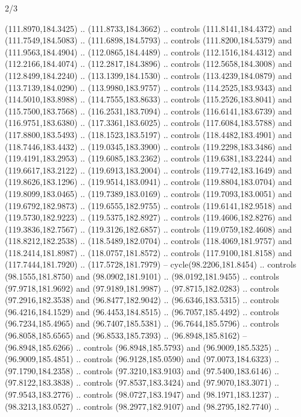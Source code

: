 \begin{flagdescription}{2/3}
\begin{scope}[shift={(0.5\flaglength,0.5)},scale=\flagwidth/320]
\begin{scope}[y=0.8pt, x=0.8pt, yscale=-1,shift={(-118.3,-146)}]
  (111.8970,184.3425) .. (111.8733,184.3662) .. controls (111.8141,184.4372) and
  (111.7549,184.5083) .. (111.6898,184.5793) .. controls (111.8200,184.5379) and
  (111.9563,184.4904) .. (112.0865,184.4489) .. controls (112.1516,184.4312) and
  (112.2166,184.4074) .. (112.2817,184.3896) .. controls (112.5658,184.3008) and
  (112.8499,184.2240) .. (113.1399,184.1530) .. controls (113.4239,184.0879) and
  (113.7139,184.0290) .. (113.9980,183.9757) .. controls (114.2525,183.9343) and
  (114.5010,183.8988) .. (114.7555,183.8633) .. controls (115.2526,183.8041) and
  (115.7500,183.7568) .. (116.2531,183.7094) .. controls (116.6141,183.6739) and
  (116.9751,183.6380) .. (117.3361,183.6025) .. controls (117.6084,183.5788) and
  (117.8800,183.5493) .. (118.1523,183.5197) .. controls (118.4482,183.4901) and
  (118.7446,183.4432) .. (119.0345,183.3900) .. controls (119.2298,183.3486) and
  (119.4191,183.2953) .. (119.6085,183.2362) .. controls (119.6381,183.2244) and
  (119.6617,183.2122) .. (119.6913,183.2004) .. controls (119.7742,183.1649) and
  (119.8626,183.1296) .. (119.9514,183.0941) .. controls (119.8804,183.0704) and
  (119.8099,183.0465) .. (119.7389,183.0169) .. controls (119.7093,183.0051) and
  (119.6792,182.9873) .. (119.6555,182.9755) .. controls (119.6141,182.9518) and
  (119.5730,182.9223) .. (119.5375,182.8927) .. controls (119.4606,182.8276) and
  (119.3836,182.7567) .. (119.3126,182.6857) .. controls (119.0759,182.4608) and
  (118.8212,182.2538) .. (118.5489,182.0704) .. controls (118.4069,181.9757) and
  (118.2414,181.8987) .. (118.0757,181.8572) .. controls (117.9100,181.8158) and
  (117.7444,181.7920) .. (117.5728,181.7979) -- cycle(98.2206,181.8454) ..
  controls (98.1555,181.8750) and (98.0902,181.9101) .. (98.0192,181.9455) ..
  controls (97.9718,181.9692) and (97.9189,181.9987) .. (97.8715,182.0283) ..
  controls (97.2916,182.3538) and (96.8477,182.9042) .. (96.6346,183.5315) ..
  controls (96.4216,184.1529) and (96.4453,184.8515) .. (96.7057,185.4492) ..
  controls (96.7234,185.4965) and (96.7407,185.5381) .. (96.7644,185.5796) ..
  controls (96.8058,185.6565) and (96.8533,185.7393) .. (96.8948,185.8162) --
  (96.8948,185.6266) .. controls (96.8948,185.5793) and (96.9009,185.5325) ..
  (96.9009,185.4851) .. controls (96.9128,185.0590) and (97.0073,184.6323) ..
  (97.1790,184.2358) .. controls (97.3210,183.9103) and (97.5400,183.6146) ..
  (97.8122,183.3838) .. controls (97.8537,183.3424) and (97.9070,183.3071) ..
  (97.9543,183.2776) .. controls (98.0727,183.1947) and (98.1971,183.1237) ..
  (98.3213,183.0527) .. controls (98.2977,182.9107) and (98.2795,182.7740) ..

\end{scope}
\end{scope}
\end{flagdescription}
